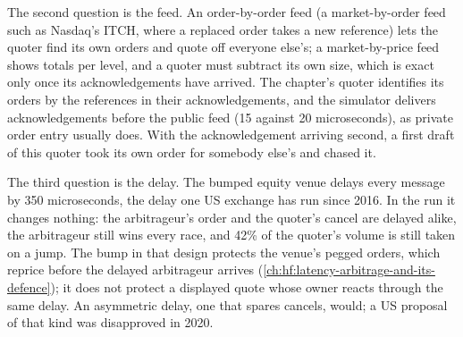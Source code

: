 The second question is the feed. An order-by-order feed (a market-by-order feed such as Nasdaq's ITCH, where a replaced order takes a new reference)
lets the quoter find its own orders and quote off everyone else's; a market-by-price feed shows totals per level, and a quoter must subtract its own
size, which is exact only once its acknowledgements have arrived. The chapter's quoter identifies its orders by the references in their
acknowledgements, and the simulator delivers acknowledgements before the public feed (15 against 20 microseconds), as private order entry
usually does. With the acknowledgement arriving second, a first draft of this quoter took its own order for somebody else's and chased it.

The third question is the delay. The bumped equity venue delays every message by 350 microseconds, the delay one US exchange has run since 2016.
In the run it changes nothing: the arbitrageur's order and the quoter's cancel are delayed alike, the arbitrageur still wins every race, and 42\% of
the quoter's volume is still taken on a jump. The bump in that design protects the venue's pegged orders, which reprice before the delayed
arbitrageur arrives (\cref{ch:hf:latency-arbitrage-and-its-defence}); it does not protect a displayed quote whose owner reacts through the same
delay. An asymmetric delay, one that spares cancels, would; a US proposal of that kind was disapproved in 2020.

\begin{omfigure}

\label{fig:hf:a-venue-playbook:picked}
\end{omfigure}

